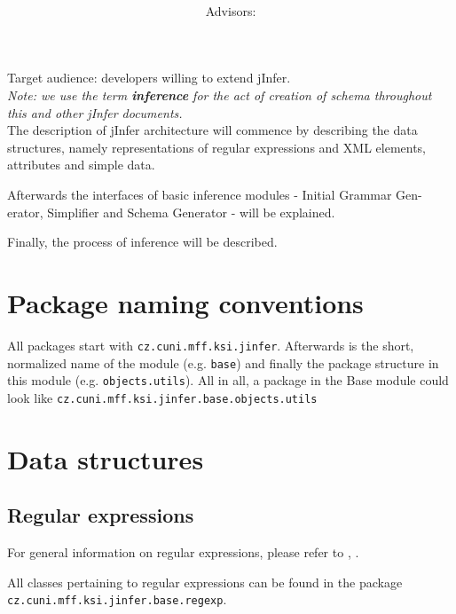 \documentclass[a4paper,10pt,oneside]{article}
\title{\bf\mftitle}
\author{\mfauthor \\ Advisors: \mfadvisor}
\date{\mfplacedate}
\newcommand{\code}[1]{\texttt{#1}}
\begin{document}
\maketitle
Target audience: developers willing to extend jInfer.\\

\textit{Note: we use the term \textbf{inference} for the act of creation of schema throughout this and other jInfer documents.}\\

The description of jInfer architecture will commence by describing the data
structures, namely representations of regular expressions and XML elements,
attributes and simple data.

Afterwards the interfaces of basic inference modules - Initial Grammar Gen-
erator, Simplifier and Schema Generator - will be explained.

Finally, the process of inference will be described.

\section{Package naming conventions}
All packages start with \code{cz.cuni.mff.ksi.jinfer}. Afterwards is the short, normalized name of the module (e.g. \code{base}) and finally the package structure in this module (e.g. \texttt{objects.utils}). All in all, a package in the Base module could look like 
\code{cz.cuni.mff.ksi.jinfer.base.objects.utils}

\section{Data structures}
\subsection{Regular expressions}

For general information on regular expressions, please refer to \cite{wikiregexp}, \cite{Hopcroft:2006:IAT:1177300}.

All classes pertaining to regular expressions can be found in the package \code{cz.cuni.mff.ksi.jinfer.base.regexp}.
\end{document}

